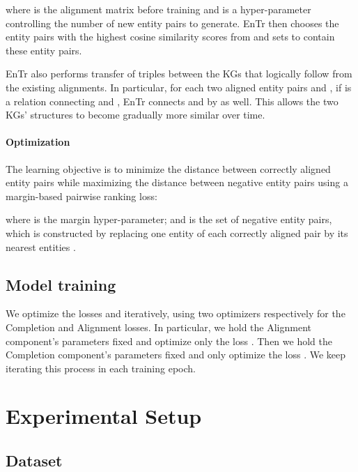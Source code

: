 \documentclass[11pt]{article}
\begin{document}
\noindent 
where  is the alignment matrix before training and  is a hyper-parameter controlling the number of new entity pairs to generate. 
EnTr then chooses the   entity pairs with the  highest cosine similarity scores from  and sets  to contain these entity pairs. 

EnTr also performs transfer of triples between the KGs that logically follow from the existing alignments. In particular, for each two aligned entity pairs  and , if  is a relation connecting  and , EnTr connects  and  by  as well. This allows the two KGs' structures to become gradually more similar over time. 


\paragraph{Optimization}
The learning objective is to minimize the distance between correctly aligned entity pairs while maximizing the distance between negative entity pairs using a  margin-based pairwise ranking loss:



\noindent where  is the margin hyper-parameter; and  is the set of negative entity pairs, which is constructed by replacing one entity of each correctly aligned pair by its nearest entities \cite{wu2019relation}. 


\subsection{Model training}\label{ssec:training}

We optimize the losses  and  iteratively, using two optimizers respectively for the Completion and Alignment losses.  In particular, we hold the Alignment component's parameters fixed and optimize only the loss  . Then we hold the Completion component's parameters fixed and only optimize the loss . We keep iterating this process in each training epoch.






\section{Experimental Setup} 

\subsection{Dataset}
\end{document}
